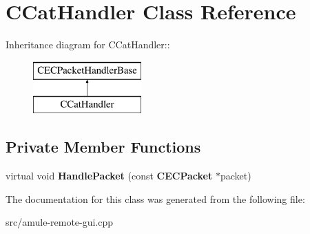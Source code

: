 \section{CCatHandler Class Reference}
\label{classCCatHandler}
Inheritance diagram for CCatHandler::\begin{figure}[H]
\begin{center}
\leavevmode
\includegraphics[height=2cm]{classCCatHandler}
\end{center}
\end{figure}
\subsection*{Private Member Functions}
\begin{DoxyCompactItemize}
\item 
virtual void {\bfseries HandlePacket} (const {\bf CECPacket} $\ast$packet)\label{classCCatHandler_af2a2f463f45254703703421e5502807a}

\end{DoxyCompactItemize}


The documentation for this class was generated from the following file:\begin{DoxyCompactItemize}
\item 
src/amule-\/remote-\/gui.cpp\end{DoxyCompactItemize}
